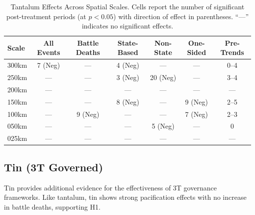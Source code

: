 \documentclass[11pt]{article}
\begin{document}
\begin{table}[H]
\centering
\caption{Tantalum Effects Across Spatial Scales. Cells report the number of significant post-treatment periods (at $p<0.05$) with direction of effect in parentheses. ``---'' indicates no significant effects.}
\label{tab:tantalum_robustness}
\begin{tabular}{lcccccc}
\toprule
Scale & All Events & Battle Deaths & State-Based & Non-State & One-Sided & Pre-Trends \\
\midrule
300km & 7 (Neg)   & ---           & 4 (Neg)     & ---       & ---       & 0--4       \\
250km & ---       & ---           & 3 (Neg)     & 20 (Neg)  & ---       & 3--4       \\
200km & ---       & ---           & ---         & ---       & ---       & ---        \\
150km & ---       & ---           & 8 (Neg)     & ---       & 9 (Neg)   & 2--5       \\
100km & ---       & 9 (Neg)       & ---         & ---       & 7 (Neg)   & 2--3       \\
050km & ---       & ---           & ---         & 5 (Neg)   & ---       & 0          \\
025km & ---       & ---           & ---         & ---       & ---       & ---        \\
\bottomrule
\end{tabular}
\end{table}

\subsection{Tin (3T Governed)}

Tin provides additional evidence for the effectiveness of 3T governance frameworks. Like tantalum, tin shows strong pacification effects with no increase in battle deaths, supporting H1.
\end{document}
